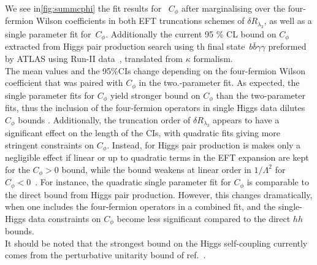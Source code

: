 \par
We see in\autoref{fig:summcphi} the fit results for~ $C_\phi$ after marginalising over the four-fermion Wilson coefficients in both EFT truncations schemes of $\delta R_{\lambda_3}$, as well as a single parameter fit for~$C_{\phi}$. Additionally the current 95 \% CL bound on $C_\phi$ extracted from Higgs pair production search using th final state~$b\bar{b} \gamma \gamma$ preformed by ATLAS using Run-II data~\cite{ATLAS:2021jki}, translated from $\kappa$ formalism.\\ The mean values and the 95\%CIs change depending on the four-fermion Wilson coefficient that was paired with $C_\phi$ in the two.-parameter fit. As expected, the single parameter fits for $C_\phi$ yield stronger bound on $C_\phi$ than the two-parameter fits, thus the inclusion of the four-fermion operators in single Higgs data dilutes $C_\phi$ bounds .  Additionally, the truncation order of  $\delta R_{\lambda_3}$ appears to have a significant effect on the length of the CIs, with quadratic fits giving more stringent constraints on $C_\phi$. Instead, for Higgs pair production  is makes only a negligible effect  if linear or up to quadratic terms in the EFT expansion are kept  for the $C_\phi>0$ bound, while the bound weakens at linear order in $1/\Lambda^2$ for $C_\phi<0$~\cite{IML}. For instance, the quadratic single parameter fit for $C_\phi$ is comparable to the direct bound from Higgs pair production. However, this changes dramatically, when one includes the four-fermion operators in a combined fit, and the single-Higgs data constraints on $C_\phi$ become less significant compared to the direct $hh$ bounds. \\
It should be noted that the strongest bound on the Higgs self-coupling currently comes from the perturbative unitarity bound of ref.~\cite{DiLuzio:2017tfn}.
